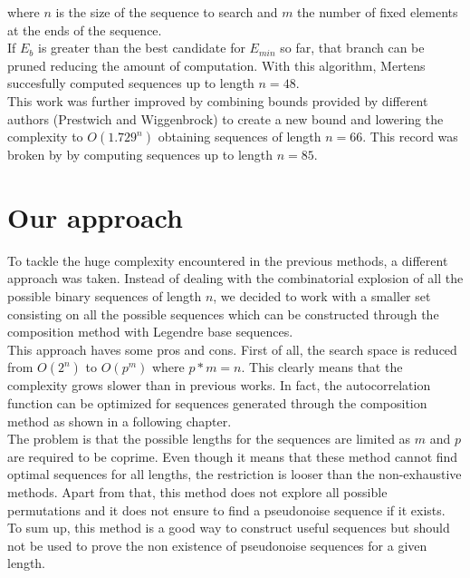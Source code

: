   where $n$ is the size of the sequence to search and $m$ the number of fixed
  elements at the ends of the sequence.\\

  If $E_b$ is greater than the best candidate for $E_{min}$ so far, that branch
  can be pruned reducing the amount of computation. With this algorithm,
  Mertens succesfully computed sequences up to length $n = 48$.\\

  This work was further improved by \citet{Packebusch_2016} combining bounds provided by different authors (Prestwich and
  Wiggenbrock) to create a new bound and  lowering the
  complexity to $O(1.729^n)$ obtaining sequences of length  $n= 66$. This
  record was broken by \citet{anatoli} by computing sequences up to length $n = 85$.\\

  \section{Our approach}

  To tackle the huge complexity encountered in the previous methods, a different
  approach was taken. Instead of dealing with the combinatorial explosion
  of all the possible binary sequences of length $n$, we decided to work with
  a smaller set consisting on all the possible sequences which can be
  constructed through the composition method with Legendre base sequences.\\

  This approach haves some pros and cons. First of all, the search space is
  reduced from $O(2^n)$ to $O(p^m)$ where $p*m = n$. This clearly means that
  the complexity grows slower than in previous works. In fact, the
  autocorrelation function can be optimized for sequences generated through the
  composition method as shown in a following chapter. \\

  The problem is that the possible lengths for the sequences are limited as $m$
  and $p$ are required to be coprime. Even though it means that
  these method cannot find optimal sequences for all lengths, the restriction is
  looser than the non-exhaustive methods. Apart from that, this method does not
  explore all possible permutations and it does not ensure to find a pseudonoise
  sequence if it exists. To sum up, this method is a good way to construct useful sequences but should not
  be used to prove the non existence of pseudonoise sequences for a given
  length.\\

